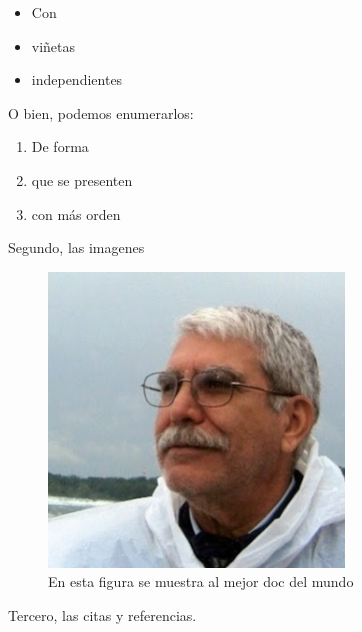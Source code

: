 \begin{itemize}
\item Con\\
\item viñetas\\
\item independientes\\
\end{itemize}

O bien, podemos enumerarlos:\\
\begin{enumerate}
\item De forma\\
\item que se presenten\\
\item con más orden\\
\end{enumerate}

\begin{center}
Segundo, las imagenes\\
\end{center}


\begin{figure}[th]
\centering
\includegraphics[width=0.70\textwidth]{Figures/DocBouzas} 
\caption[Foto Sorpresa]{En esta figura se muestra al mejor doc del mundo}
\label{Figura}
\end{figure}



\begin{center}
Tercero, las citas y referencias.\\
\end{center}

